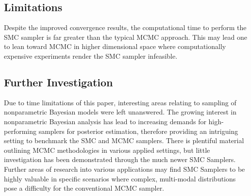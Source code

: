 \documentclass[12pt]{elsarticle}
\begin{document}
\subsection*{Limitations}
Despite the improved convergence results, the computational time to perform the SMC sampler is far greater than the typical MCMC approach. This may lead one to lean toward MCMC in higher dimensional space where computationally expensive experiments render the SMC sampler infeasible.

\subsection*{Further Investigation}
Due to time limitations of this paper, interesting areas relating to sampling of nonparametric Bayesian models were left unanswered. The growing interest in nonparametric Bayesian analysis has lead to increasing demands for high-performing samplers for posterior estimation, therefore providing an intriguing setting to benchmark the SMC and MCMC samplers. There is plentiful material outlining MCMC methodologies in various applied settings, but little investigation has been demonstrated through the much newer SMC Samplers. Further areas of research into various applications may find SMC Samplers to be highly valuable in specific scenarios where complex, multi-modal distributions pose a difficulty for the conventional MCMC sampler.


%
\nocite{Bishop2007}
\nocite{Murphy2012}
\nocite{Lindsten2014}


\end{document}
